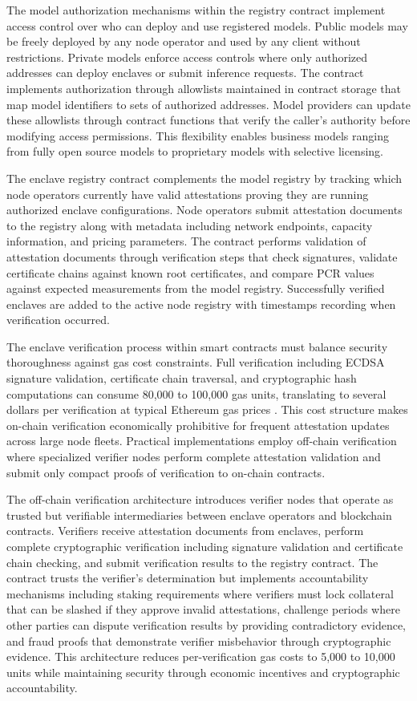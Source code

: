 The model authorization mechanisms within the registry contract implement access control over who can deploy and use registered models. Public models may be freely deployed by any node operator and used by any client without restrictions. Private models enforce access controls where only authorized addresses can deploy enclaves or submit inference requests. The contract implements authorization through allowlists maintained in contract storage that map model identifiers to sets of authorized addresses. Model providers can update these allowlists through contract functions that verify the caller's authority before modifying access permissions. This flexibility enables business models ranging from fully open source models to proprietary models with selective licensing.

The enclave registry contract complements the model registry by tracking which node operators currently have valid attestations proving they are running authorized enclave configurations. Node operators submit attestation documents to the registry along with metadata including network endpoints, capacity information, and pricing parameters. The contract performs validation of attestation documents through verification steps that check signatures, validate certificate chains against known root certificates, and compare PCR values against expected measurements from the model registry. Successfully verified enclaves are added to the active node registry with timestamps recording when verification occurred.

The enclave verification process within smart contracts must balance security thoroughness against gas cost constraints. Full verification including ECDSA signature validation, certificate chain traversal, and cryptographic hash computations can consume 80,000 to 100,000 gas units, translating to several dollars per verification at typical Ethereum gas prices \cite{ethereum_yellow}. This cost structure makes on-chain verification economically prohibitive for frequent attestation updates across large node fleets. Practical implementations employ off-chain verification where specialized verifier nodes perform complete attestation validation and submit only compact proofs of verification to on-chain contracts.

The off-chain verification architecture introduces verifier nodes that operate as trusted but verifiable intermediaries between enclave operators and blockchain contracts. Verifiers receive attestation documents from enclaves, perform complete cryptographic verification including signature validation and certificate chain checking, and submit verification results to the registry contract. The contract trusts the verifier's determination but implements accountability mechanisms including staking requirements where verifiers must lock collateral that can be slashed if they approve invalid attestations, challenge periods where other parties can dispute verification results by providing contradictory evidence, and fraud proofs that demonstrate verifier misbehavior through cryptographic evidence. This architecture reduces per-verification gas costs to 5,000 to 10,000 units while maintaining security through economic incentives and cryptographic accountability.

